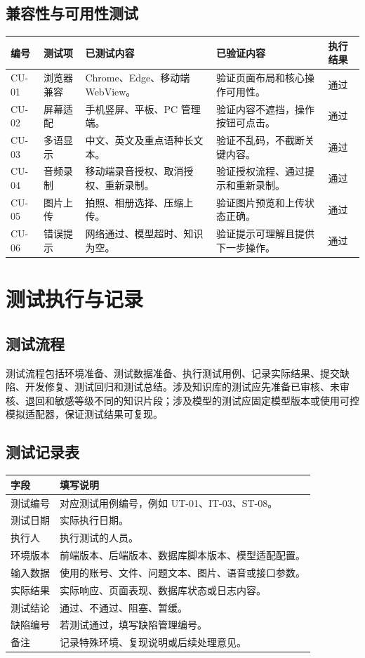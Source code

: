 \subsection{兼容性与可用性测试}

\begin{longtable}{@{}p{1.2cm}p{3.0cm}p{3.8cm}p{3.4cm}p{1.1cm}@{}}
\toprule
编号 & 测试项 & 已测试内容 & 已验证内容 & 执行结果 \\
\midrule
CU-01 & 浏览器兼容 & Chrome、Edge、移动端 WebView。 & 验证页面布局和核心操作可用性。 &通过\\
CU-02 & 屏幕适配 & 手机竖屏、平板、PC 管理端。 & 验证内容不遮挡，操作按钮可点击。 &通过\\
CU-03 & 多语显示 & 中文、英文及重点语种长文本。 & 验证不乱码，不截断关键内容。 &通过\\
CU-04 & 音频录制 & 移动端录音授权、取消授权、重新录制。 & 验证授权流程、通过提示和重新录制。 &通过\\
CU-05 & 图片上传 & 拍照、相册选择、压缩上传。 & 验证图片预览和上传状态正确。 &通过\\
CU-06 & 错误提示 & 网络通过、模型超时、知识为空。 & 验证提示可理解且提供下一步操作。 &通过\\
\bottomrule
\end{longtable}

\section{测试执行与记录}

\subsection{测试流程}

测试流程包括环境准备、测试数据准备、执行测试用例、记录实际结果、提交缺陷、开发修复、测试回归和测试总结。涉及知识库的测试应先准备已审核、未审核、退回和敏感等级不同的知识片段；涉及模型的测试应固定模型版本或使用可控模拟适配器，保证测试结果可复现。

\subsection{测试记录表}

\begin{longtable}{p{2.7cm}p{10.7cm}}
\toprule
字段 & 填写说明 \\
\midrule
测试编号 & 对应测试用例编号，例如 UT-01、IT-03、ST-08。 \\
测试日期 & 实际执行日期。 \\
执行人 & 执行测试的人员。 \\
环境版本 & 前端版本、后端版本、数据库脚本版本、模型适配配置。 \\
输入数据 & 使用的账号、文件、问题文本、图片、语音或接口参数。 \\
实际结果 & 实际响应、页面表现、数据库状态或日志内容。 \\
测试结论 & 通过、不通过、阻塞、暂缓。 \\
缺陷编号 & 若测试通过，填写缺陷管理编号。 \\
备注 & 记录特殊环境、复现说明或后续处理意见。 \\
\bottomrule
\end{longtable}

